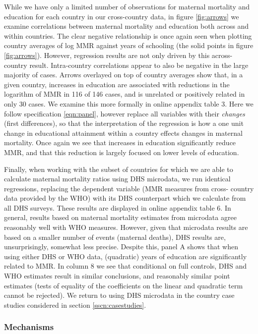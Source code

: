 \documentclass{article}[12pt,subeqn]
\begin{document}
\begin{spacing}{1.4}
While we have only a limited number of observations for maternal
mortality and education for each country in our cross-country data, in figure
\ref{fig:arrows} we examine correlations between maternal mortality and 
education both across and within countries.  The clear negative relationship
is once again seen when plotting country averages of log MMR against years of
schooling (the solid points in figure \ref{fig:arrows}).  However, regression
results are not only driven by this across-country result.  Intra-country
correlations appear to also be negative in the large majority of cases. Arrows
overlayed on top of country averages show that, in a given country, increases
in education are associated with reductions in the logarithm of MMR in 116 of
146 cases, and is unrelated or positively related in only 30 cases.  We examine
this more formally in online appendix table 3.  Here we follow
specification \ref{eqn:panel}, however replace all variables with their
\emph{changes} (first differences), so that the interpretation of the regression
is how a one unit change in educational attainment within a country effects
changes in maternal mortality.  Once again we see that increases in education
significantly reduce MMR, and that this reduction is largely focused on
lower levels of education.

Finally, when working with the subset of countries for which we are able to
calculate maternal mortality ratios using DHS microdata, we run identical
regressions, replacing the dependent variable (MMR measures from cross-%
country data provided by the WHO) with its DHS counterpart which we 
calculate from all DHS surveys.  These results are displayed in online
appendix table 6.  In general, results based on maternal mortality estimates
from microdata agree reasonably well with WHO measures.  However, given that
microdata results are based on a smaller number of events (maternal deaths),
DHS results are, unsurprisingly, somewhat less precise.  Despite this, panel
A shows that when using either DHS or WHO data, (quadratic) years of education
are significantly related to MMR.  In column 8 we see that conditional on full
controls, DHS and WHO estimates result in similar conclusions, and reasonably
similar point estimates (tests of equality of the coefficients on the linear
and quadratic term cannot be rejected).  We return to using DHS microdata
in the country case studies considered in section \ref{sscn:casestudies}.

\subsubsection{Mechanisms}

\end{spacing}
\end{document}
